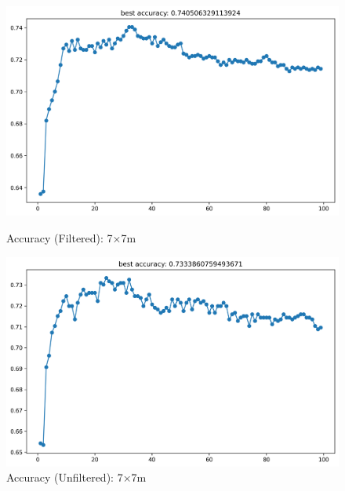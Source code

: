 \documentclass[runningheads]{llncs}
\begin{document}
\begin{figure}[H]
	\centering
	\begin{minipage}{0.49\textwidth}
		\centering
		\includegraphics[width=\textwidth]{figures/filtered/knn_acc_7.png}
		\caption*{Accuracy (Filtered): 7×7m}
	\end{minipage}
	\hfill
	\begin{minipage}{0.49\textwidth}
		\centering
		\includegraphics[width=\textwidth]{figures/unfiltered/knn_acc_7.png}
		\caption*{Accuracy (Unfiltered): 7×7m}
	\end{minipage}
\end{figure}
\end{document}
